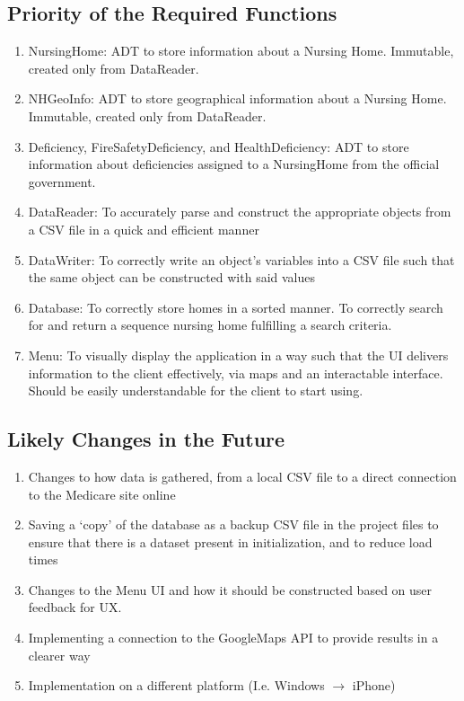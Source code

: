\documentclass[12pt]{article}
\begin{document}
\subsection{Priority of the Required Functions}
\begin{enumerate}
\item NursingHome: ADT to store information about a Nursing Home. Immutable, created only from DataReader. 
\item NHGeoInfo: ADT to store geographical information about a Nursing Home. Immutable, created only from DataReader. 
\item Deficiency, FireSafetyDeficiency, and HealthDeficiency: ADT to store information about deficiencies assigned to a NursingHome from the official government.
\item DataReader: To accurately parse and construct the appropriate objects from a CSV file in a quick and efficient manner
\item DataWriter: To correctly write an object's variables into a CSV file such that the same object can be constructed with said values
\item Database: To correctly store homes in a sorted manner. To correctly search for and return a sequence nursing home fulfilling a search criteria. 
\item Menu: To visually display the application in a way such that the UI delivers information to the client effectively, via maps and an interactable interface. Should be easily understandable for the client to start using.
\end{enumerate}

\subsection{Likely Changes in the Future}
\begin{enumerate}
\item Changes to how data is gathered, from a local CSV file to a direct connection to the Medicare site online
\item Saving a `copy' of the database as a backup CSV file in the project files to ensure that there is a dataset present in initialization, and to reduce load times
\item Changes to the Menu UI and how it should be constructed based on user feedback for UX.
\item Implementing a connection to the GoogleMaps API to provide results in a clearer way
\item Implementation on a different platform (I.e. Windows $\rightarrow$ iPhone)
\end{enumerate}
\end{document}
